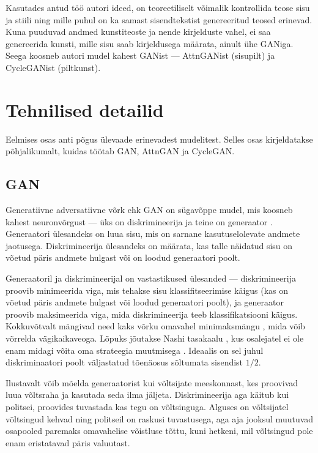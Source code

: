 \documentclass{vilgym}
\begin{document}
	Kasutades antud töö autori ideed, on teoreetiliselt võimalik kontrollida teose sisu ja stiili ning mille puhul on ka samast sisendtekstist genereeritud teosed erinevad. Kuna puuduvad andmed kunstiteoste ja nende kirjelduste vahel, ei saa genereerida kunsti, mille sisu saab kirjeldusega määrata, ainult ühe GANiga. Seega koosneb autori mudel kahest GANist --- AttnGANist (sisu\textrightarrow pilt) ja CycleGANist (pilt\textrightarrow kunst). %


	\section{Tehnilised detailid}
	Eelmises osas anti põgus ülevaade erinevadest mudelitest. Selles osas kirjeldatakse põhjalikumalt, kuidas töötab GAN, AttnGAN ja CycleGAN.

	\subsection{GAN}
	Generatiivne adversatiivne võrk ehk GAN  on sügavõppe mudel, mis koosneb kahest neuronvõrgust --- üks on diskrimineerija  ja teine on generaator .  Generaatori ülesandeks on luua sisu, mis on sarnane kasutuselolevate andmete jaotusega. Diskrimineerija ülesandeks on määrata, kas talle näidatud sisu on võetud päris andmete hulgast või on loodud generaatori poolt.
	
	Generaatoril ja diskrimineerijal on vastastikused ülesanded --- diskrimineerija proovib minimeerida viga, mis tehakse sisu klassifitseerimise käigus (kas on võetud päris andmete hulgast või loodud generaatori poolt), ja generaator proovib maksimeerida viga, mida diskrimineerija teeb klassifikatsiooni käigus. Kokkuvõtvalt mängivad need kaks võrku omavahel minimaksmängu , mida võib võrrelda vägikaikaveoga. Lõpuks jõutakse Nashi tasakaalu , kus osalejatel ei ole enam midagi võita oma strateegia muutmisega \parencite{gametheory}. Ideaalis on sel juhul diskriminaatori poolt väljastatud tõenäosus sõltumata sisendist $ 1/2 $.

	Ilustavalt võib mõelda generaatorist kui võltsijate meeskonnast, kes proovivad luua võltsraha ja kasutada seda ilma jäljeta. Diskrimineerija aga käitub kui politsei, proovides tuvastada kas tegu on võltsinguga. Alguses on võltsijatel võltsingud kehvad ning politseil on raskusi tuvastusega, aga aja jooksul muutuvad osapooled paremaks omavahelise võistluse tõttu, kuni hetkeni, mil võltsingud pole enam eristatavad päris valuutast.
\end{document}

